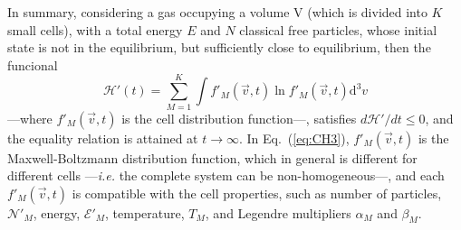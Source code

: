 In summary, considering a gas occupying a volume V (which is divided into $K$ small cells), with a
total energy $E$ and $N$ classical free particles, whose initial state is not in the equilibrium,
but sufficiently close to equilibrium, then the funcional
%
\begin{equation}\label{eq:CH3}
   \mathcal{H}'(t)=\sum_{M=1}^{K}\int f'_M(\vec{v},t) \ln f'_M(\vec{v},t)\mathrm{d}^3v
\end{equation}
%
---where $f'_M(\vec{v},t)$ is the cell distribution function---,
satisfies $d\mathcal{H}'/dt\leq0$, and the equality relation is attained at $t\to\infty$.
In Eq.~(\ref{eq:CH3}), $f'_M(\vec{v},t)$ is the Maxwell-Boltzmann distribution
function, which in general is different for different cells ---\textit{i.e.} the complete system
can be non-homogeneous---, and each $f'_M(\vec v,t)$ is compatible
with the cell properties, such as number of particles, $\mathcal{N}'_M$, energy, $\mathcal{E}'_M$, temperature,
$T_M$, and Legendre multipliers $\alpha_M$ and $\beta_M$. 


